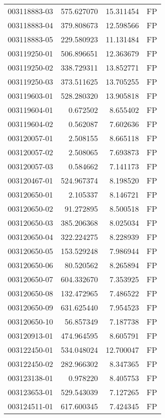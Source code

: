 \begin{tabular}{lrrl}
003118883-03 &  575.627070 &    15.311454 &   FP \\
003118883-04 &  379.808673 &    12.598566 &   FP \\
003118883-05 &  229.580923 &    11.131484 &   FP \\
003119250-01 &  506.896651 &    12.363679 &   FP \\
003119250-02 &  338.729311 &    13.852771 &   FP \\
003119250-03 &  373.511625 &    13.705255 &   FP \\
003119603-01 &  528.280320 &    13.905818 &   FP \\
003119604-01 &    0.672502 &     8.655402 &   FP \\
003119604-02 &    0.562087 &     7.602636 &   FP \\
003120057-01 &    2.508155 &     8.665118 &   FP \\
003120057-02 &    2.508065 &     7.693873 &   FP \\
003120057-03 &    0.584662 &     7.141173 &   FP \\
003120467-01 &  524.967374 &     8.198520 &   FP \\
003120650-01 &    2.105337 &     8.146721 &   FP \\
003120650-02 &   91.272895 &     8.500518 &   FP \\
003120650-03 &  385.206368 &     8.025034 &   FP \\
003120650-04 &  322.224275 &     8.228939 &   FP \\
003120650-05 &  153.529248 &     7.986944 &   FP \\
003120650-06 &   80.520562 &     8.265894 &   FP \\
003120650-07 &  604.332670 &     7.353925 &   FP \\
003120650-08 &  132.472965 &     7.486522 &   FP \\
003120650-09 &  631.625440 &     7.954523 &   FP \\
003120650-10 &   56.857349 &     7.187738 &   FP \\
003120913-01 &  474.964595 &     8.605791 &   FP \\
003122450-01 &  534.048024 &    12.700047 &   FP \\
003122450-02 &  282.966302 &     8.347365 &   FP \\
003123138-01 &    0.978220 &     8.405753 &   FP \\
003123653-01 &  529.543039 &     7.127265 &   FP \\
003124511-01 &  617.600345 &     7.424345 &   FP \\

\end{tabular}
